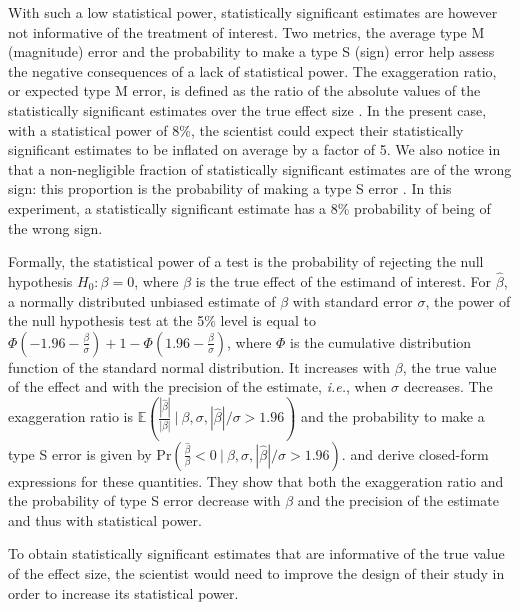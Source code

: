 \documentclass[12pt]{article}
\begin{document}
    With such a low statistical power, statistically significant estimates are however not informative of the treatment of interest. Two metrics, the average type M (magnitude) error and the probability to make a type S (sign) error help assess the negative consequences of a lack of statistical power. The exaggeration ratio, or expected type M error, is defined as the ratio of the absolute values of the statistically significant estimates over the true effect size \citep{gelman_beyond_2014}. In the present case, with a statistical power of 8\%, the scientist could expect their statistically significant estimates to be inflated on average by a factor of 5. We also notice in  that a non-negligible fraction of statistically significant estimates are of the wrong sign: this proportion is the probability of making a type S error \citep{gelman_beyond_2014}. In this experiment, a statistically significant estimate has a 8\% probability of being of the wrong sign. 
    
    Formally, the statistical power of a test is the probability of rejecting the null hypothesis $H_{0}: \beta = 0$, where $\beta$ is the true effect of the estimand of interest. For $\hat{\beta}$, a normally distributed unbiased estimate of $\beta$ with standard error $\sigma$, the power of the null hypothesis test at the 5\% level is equal to $\Phi\left(-1.96-\frac{\beta}{\sigma}\right)+1-\Phi\left(1.96-\frac{\beta}{\sigma}\right)$, where $\Phi$ is the cumulative distribution function of the standard normal distribution. It increases with $\beta$, the true value of the effect and with the precision of the estimate, \textit{i.e.}, when $\sigma$ decreases. The exaggeration ratio is $\mathbb{E}\left(\frac{|\hat{\beta}|}{|\beta|} \ \bigg| \ \beta, \sigma, |\hat{\beta}|/\sigma>1.96\right)$ and the probability to make a type S error is given by $\text{Pr}\left(\frac{\hat{\beta}}{\beta} < 0 \ \bigg| \ \beta, \sigma, |\hat{\beta}|/\sigma>1.96 \right)$.  \cite{zwet_significance_2021} and \cite{lu_note_2019} derive closed-form expressions for these quantities. They show that both the exaggeration ratio and the probability of type S error decrease with $\beta$ and the precision of the estimate and thus with statistical power. %

    To obtain statistically significant estimates that are informative of the true value of the effect size, the scientist would need to improve the design of their study in order to increase its statistical power.
    
\end{document}
